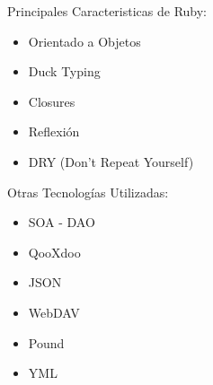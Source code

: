 \begin{frame}{Principales Caracteristicas de Ruby:\newline}

\begin{itemize}
	
	\item Orientado a Objetos
	\pause
	\item Duck Typing
	\pause
	\item Closures
	\pause
	\item Reflexión
	\pause
	\item DRY (Don't Repeat Yourself)
	
\end{itemize}

\end{frame}

\begin{frame}{Otras Tecnologías Utilizadas:\newline}
\begin{itemize}
	
	\item SOA - DAO
	\pause
	\item QooXdoo
	\pause
	\item JSON
	\pause
	\item WebDAV
	\pause
	\item Pound
	\pause
	\item YML
	
\end{itemize}
\end{frame}
